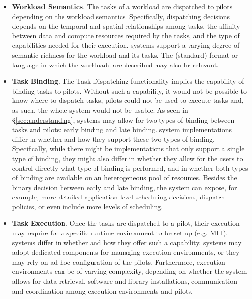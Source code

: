 \documentclass{sig-alternate}
\begin{document}
\begin{itemize}
\item \textbf{Workload Semantics}. The tasks of a workload are dispatched to
  pilots depending on the workload semantics. Specifically, dispatching
  decisions depends on the temporal and spatial relationships among tasks, the
  affinity between data and compute resources required by the tasks, and the
  type of capabilities needed for their execution. \pilot systems support a
  varying degree of semantic richness for the workload and its tasks. The
  (standard) format or language in which the workloads are described may also be
  relevant.



\item \textbf{Task Binding}. The Task Dispatching functionality implies the
  capability of binding tasks to pilots. Without such a capability, it would
  not be possible to know where to dispatch tasks, pilots could not be used to
  execute tasks and, as such, the whole \pilot system would not be usable. As
  seen in \S\ref{sec:understanding}, \pilot systems may allow for two types of
  binding between tasks and pilots: early binding and late binding. \pilot
  system implementations differ in whether and how they support these two types
  of binding. Specifically, while there might be implementations that only
  support a single type of binding, they might also differ in whether they allow
  for the users to control directly what type of binding is performed, and in
  whether both types of binding are available on an heterogeneous pool of
  resources. Besides the binary decision between early and late binding, the
  \pilot system can expose, for example, more detailed application-level
  scheduling decisions, dispatch policies, or even include more levels of
  scheduling.

\item \textbf{Task Execution}. Once the tasks are dispatched to a pilot, their
  execution may require for a specific runtime environment to be set up (e.g.
  MPI). \pilot systems differ in whether and how they offer such a capability.
  \pilot systems may adopt dedicated components for managing execution
  environments, or they may rely on ad hoc configuration of the pilots.
  Furthermore, execution environments can be of varying complexity, depending on
  whether the \pilot system allows for data retrieval, software and library
  installations, communication and coordination among execution environments and
  pilots.


\end{itemize}
\end{document}
